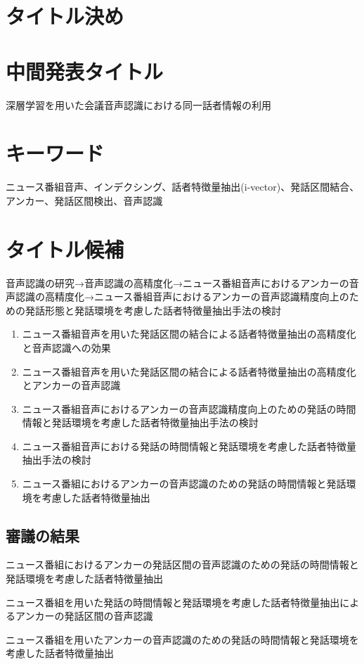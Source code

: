 \documentclass[11pt,a4paper]{jsarticle}
\begin{document}
%
%
\section*{タイトル決め}
\section{中間発表タイトル}
深層学習を用いた会議音声認識における同一話者情報の利用

\section{キーワード}
ニュース番組音声、インデクシング、話者特徴量抽出(i-vector)、発話区間結合、アンカー、発話区間検出、音声認識
\section{タイトル候補}
音声認識の研究→音声認識の高精度化→ニュース番組音声におけるアンカーの音声認識の高精度化→ニュース番組音声におけるアンカーの音声認識精度向上のための発話形態と発話環境を考慮した話者特徴量抽出手法の検討

\begin{enumerate}
\item ニュース番組音声を用いた発話区間の結合による話者特徴量抽出の高精度化と音声認識への効果
\item ニュース番組音声を用いた発話区間の結合による話者特徴量抽出の高精度化とアンカーの音声認識
\item ニュース番組音声におけるアンカーの音声認識精度向上のための発話の時間情報と発話環境を考慮した話者特徴量抽出手法の検討
\item ニュース番組音声における発話の時間情報と発話環境を考慮した話者特徴量抽出手法の検討
\item ニュース番組におけるアンカーの音声認識のための発話の時間情報と発話環境を考慮した話者特徴量抽出
\end{enumerate}\par

\subsection{審議の結果}
ニュース番組におけるアンカーの発話区間の音声認識のための発話の時間情報と発話環境を考慮した話者特徴量抽出

ニュース番組を用いた発話の時間情報と発話環境を考慮した話者特徴量抽出によるアンカーの発話区間の音声認識

ニュース番組を用いたアンカーの音声認識のための発話の時間情報と発話環境を考慮した話者特徴量抽出



%
%
\end{document}
